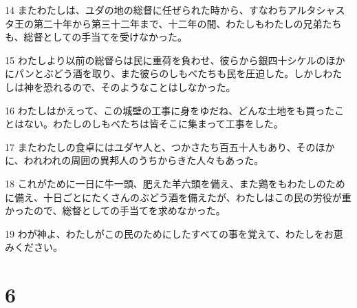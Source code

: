 \par 14 またわたしは、ユダの地の総督に任ぜられた時から、すなわちアルタシャスタ王の第二十年から第三十二年まで、十二年の間、わたしもわたしの兄弟たちも、総督としての手当てを受けなかった。
\par 15 わたしより以前の総督らは民に重荷を負わせ、彼らから銀四十シケルのほかにパンとぶどう酒を取り、また彼らのしもべたちも民を圧迫した。しかしわたしは神を恐れるので、そのようなことはしなかった。
\par 16 わたしはかえって、この城壁の工事に身をゆだね、どんな土地をも買ったことはない。わたしのしもべたちは皆そこに集まって工事をした。
\par 17 またわたしの食卓にはユダヤ人と、つかさたち百五十人もあり、そのほかに、われわれの周囲の異邦人のうちからきた人々もあった。
\par 18 これがために一日に牛一頭、肥えた羊六頭を備え、また鶏をもわたしのために備え、十日ごとにたくさんのぶどう酒を備えたが、わたしはこの民の労役が重かったので、総督としての手当てを求めなかった。
\par 19 わが神よ、わたしがこの民のためにしたすべての事を覚えて、わたしをお恵みください。

\chapter{6}

